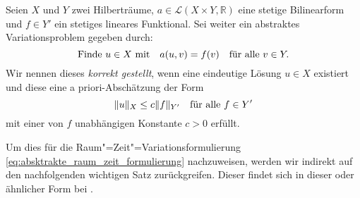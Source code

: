 \documentclass[../main.tex]{subfiles}
\begin{document}
\begin{Definition}[Hadamard]
\label{definition:sachgemaess_gestellt_nach_hadamard}
    Seien $X$ und $Y$ zwei Hilberträume, $a \in \mathcal L(X \times Y, \mathbb{R})$ eine stetige Bilinearform und $f \in Y'$ ein stetiges lineares Funktional.
    Sei weiter ein abstraktes Variationsproblem gegeben durch:
    \begin{equation}
    \label{eq:hadamard_variationsproblem}
        \text{Finde } u \in X \text{ mit} \quad a(u, v) = f(v) \quad \fa v \in Y.
    \end{equation}
    Wir nennen dieses \emph{korrekt gestellt}, wenn eine eindeutige Lösung $u \in X$ existiert und diese eine a priori-Abschätzung der Form
    \begin{equation}
    \label{eq:hadamard_abschaetzung}
        \norm{u}_{X} \leq c \norm{f}_{Y'} \quad \fa f \in Y'
    \end{equation}
    mit einer von $f$ unabhängigen Konstante $c > 0$ erfüllt.
\end{Definition}

Um dies für die Raum"=Zeit"=Variationsformulierung \cref{eq:absktrakte_raum_zeit_formulierung} nachzuweisen, werden wir indirekt auf den nachfolgenden wichtigen Satz zurückgreifen.
Dieser findet sich in dieser oder ähnlicher Form bei \textcites[Theorem 2.1]{Babuska:1971fx}[Theorem 5.2.1]{Aziz:1972wf}[Theorem \S{}3.3.6]{Braess:2007wm}.
\end{document}

